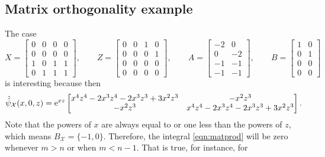 \documentclass[10pt,a4paper]{amsart}
\numberwithin{equation}{section}
\theoremstyle{definition}
\def\X{\mathcal{X}}
\begin{document}
\subsection{Matrix orthogonality example}
The case
\[
X=\left[\begin{matrix}
 0 & 0 & 0 & 0 \\
 0 & 0 & 0 & 0 \\
 1 & 0 & 1 & 1 \\
 0 & 1 & 1 & 1
 \end{matrix}\right],\qquad
Z=\left[\begin{matrix}
 0 & 0 & 1 & 0 \\
 0 & 0 & 0 & 1 \\
 0 & 0 & 0 & 0 \\
 0 & 0 & 0 & 0 \end{matrix}\right],\qquad
A=\left[\begin{matrix}
 -2 & 0 \\
 0 & -2 \\
 -1 & -1 \\
 -1 & -1 \end{matrix}\right],\qquad
B=\left[\begin{matrix}
 1 & 0 \\
 0 & 1 \\
 0 & 0 \\
 0 & 0 \end{matrix}\right]
\]
is interesting because then
\[
\hat{\hat\psi}_{\X}(x,0,z)={\rm e}^{xz}\left[\begin{matrix} x^4 z^4-2 x^3 z^4-2 x^3 z^3+3 x^2 z^3 & -x^2 z^3 \\
 -x^2 z^3 & x^4 z^4-2 x^3 z^4-2 x^3 z^3+3 x^2 z^3\end{matrix}\right].
\]
Note that the powers of $x$ are always equal to or one less than the
powers of $z$, which means $B_{\X}=\{-1,0\}$. Therefore, the
integral \eqref{eqn:matprod} will be zero whenever $m>n$ or when
$m<n-1$. That is true, for instance, for
\end{document}
